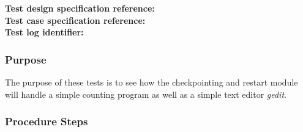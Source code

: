 


\noindent\textbf{Test design specification reference: }\\
\noindent\textbf{Test case specification reference: }\\
\noindent\textbf{Test log identifier: }




\subsubsection{Purpose}
The purpose of these tests is to see how the checkpointing and restart module will handle a simple counting program as well as a simple text editor \emph{gedit}.

\subsubsection{Procedure Steps}


